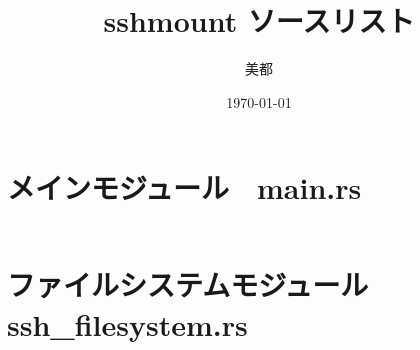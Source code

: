 \documentclass[paper=a4paper, fontsize=10pt, head_space=10mm, foot_space=17mm, gutter=17mm, line_length=185mm, twoside]{jlreq}
\title{sshmount ソースリスト}
\author{美都}
\date{\today}
\begin{document}
\maketitle
\tableofcontents
\clearpage

\section{メインモジュール　main.rs}
\inputminted[linenos, breaklines]{rust}{src/main.rs}
\clearpage

\section{ファイルシステムモジュール ssh\_filesystem.rs}
\inputminted[linenos, breaklines]{rust}{src/ssh_filesystem.rs}
\end{document}

